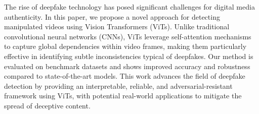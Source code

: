 The rise of deepfake technology has posed significant challenges for digital media authenticity. In this paper, we propose a novel approach for detecting manipulated videos using Vision Transformers (ViTs). Unlike traditional convolutional neural networks (CNNs), ViTs leverage self-attention mechanisms to capture global dependencies within video frames, making them particularly effective in identifying subtle inconsistencies typical of deepfakes. Our method is evaluated on benchmark datasets and shows improved accuracy and robustness compared to state-of-the-art models. This work advances the field of deepfake detection by providing an interpretable, reliable, and adversarial-resistant framework using ViTs, with potential real-world applications to mitigate the spread of deceptive content.
